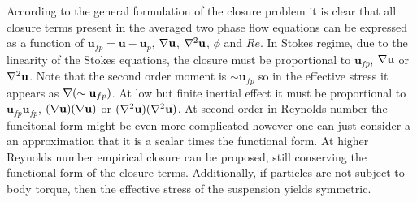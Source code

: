 According to the general formulation of the closure problem it is clear that all closure terms present in the averaged two phase flow equations can be expressed as a function of $\textbf{u}_{fp} =\textbf{u}- \textbf{u}_p$, $\mathbf{\nabla} \textbf{u}$, $\mathbf{\nabla}^2 \textbf{u}$, $\phi$ and $Re$. 
In Stokes regime, due to the linearity of the Stokes equations, the closure must be proportional to $\textbf{u}_{fp}$, $\mathbf{\nabla} \textbf{u}$ or $\mathbf{\nabla}^2 \textbf{u}$. 
Note that the second order moment is $\sim \textbf{u}_{fp}$ so in the effective stress it appears as $\mathbf{\nabla}(\sim \textbf{u}_{fp})$. 
At low but finite inertial effect it must be proportional to $\textbf{u}_{fp}\textbf{u}_{fp}$, $(\mathbf{\nabla} \textbf{u})(\mathbf{\nabla} \textbf{u})$ or $(\mathbf{\nabla}^2 \textbf{u})(\mathbf{\nabla}^2 \textbf{u})$. 
At second order in Reynolds number the funcitonal form might be even more complicated however one can just consider a an approximation that it is a scalar times the functional form. 
At higher Reynolds number empirical closure can be proposed, still conserving the functional form of the closure terms. 
Additionally, if particles are not subject to body torque, then the effective stress of the suspension yields symmetric.

